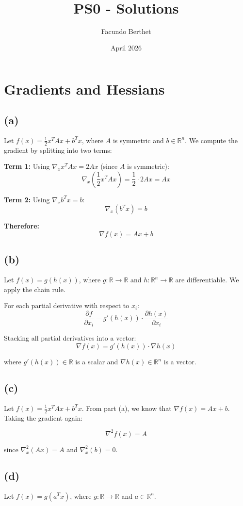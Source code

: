 \documentclass{article}
\title{PS0 - Solutions}
\author{Facundo Berthet}
\date{April 2026}
\begin{document}
\maketitle

\section{Gradients and Hessians}

\subsection*{(a)}
Let $f(x) = \frac{1}{2}x^TAx + b^Tx$, where $A$ is symmetric and $b \in \mathbb{R}^n$. 
We compute the gradient by splitting into two terms:

\textbf{Term 1:} Using $\nabla_x x^TAx = 2Ax$ (since $A$ is symmetric):
$$\nabla_x\left(\frac{1}{2}x^TAx\right) = \frac{1}{2} \cdot 2Ax = Ax$$

\textbf{Term 2:} Using $\nabla_x b^Tx = b$:
$$\nabla_x\left(b^Tx\right) = b$$

\textbf{Therefore:}
$$\nabla f(x) = Ax + b$$

\subsection*{(b)}
Let $f(x) = g(h(x))$, where $g : \mathbb{R} \to \mathbb{R}$ and 
$h : \mathbb{R}^n \to \mathbb{R}$ are differentiable. We apply the chain rule.

For each partial derivative with respect to $x_i$:
$$\frac{\partial f}{\partial x_i} = g'(h(x)) \cdot \frac{\partial h(x)}{\partial x_i}$$

Stacking all partial derivatives into a vector:
$$\boxed{\nabla f(x) = g'(h(x)) \cdot \nabla h(x)}$$

where $g'(h(x)) \in \mathbb{R}$ is a scalar and $\nabla h(x) \in \mathbb{R}^n$ is a vector.

\subsection*{(c)}
Let $f(x) = \frac{1}{2}x^TAx + b^Tx$. From part (a), we know that 
$\nabla f(x) = Ax + b$. Taking the gradient again:

$$\nabla^2 f(x) = A$$

since $\nabla^2_x(Ax) = A$ and $\nabla^2_x(b) = 0$.

\subsection*{(d)}
Let $f(x) = g(a^Tx)$, where $g : \mathbb{R} \to \mathbb{R}$ and $a \in \mathbb{R}^n$.
\end{document}
